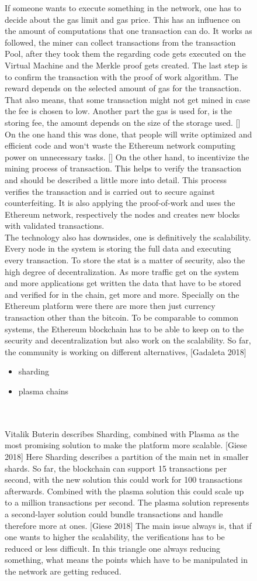 \begin{figure}[ht]
If someone wants to execute something in the network, one has to decide about the gas limit and gas price. This has an influence on the amount of computations that one transaction can do. It works as followed, the miner can collect transactions from the transaction Pool, after they took them the regarding code gets executed on the Virtual Machine and the Merkle proof gets created. The last step is to confirm the transaction with the proof of work algorithm. The reward depends on the selected amount of gas for the transaction. That also means, that some transaction might not get mined in case the fee is chosen to low. Another part the gas is used for, is the storing fee, the amount depends on the size of the storage used. []
On the one hand this was done, that people will write optimized and efficient code and won`t waste the Ethereum network computing power on unnecessary tasks. [] On the other hand, to incentivize the mining process of transaction. This helps to verify the transaction and should be described a little more into detail. This process verifies the transaction and is carried out to secure against counterfeiting. It is also applying the proof-of-work and uses the Ethereum network, respectively the nodes and creates new blocks with validated transactions. 
\\
The technology also has downsides, one is definitively the scalability. Every node in the system is storing the full data and executing every transaction. To store the stat is a matter of security, also the high degree of decentralization. As more traffic get on the system and more applications get written the data that have to be stored and verified for in the chain, get more and more. Specially on the Ethereum platform were there are more then just currency transaction other than the bitcoin. To be comparable to common systems, the Ethereum blockchain has to be able to keep on to the security and decentralization but also work on the scalability. 
So far, the community is working on different alternatives, [Gadaleta 2018]
\\
\begin{itemize}
\item sharding
\item plasma chains
\end{itemize}
\\
\\
Vitalik Buterin describes Sharding, combined with Plasma as the most promising solution to make the platform more scalable. [Giese 2018] Here Sharding describes a partition of the main net in smaller shards. So far, the blockchain can support 15 transactions per second, with the new solution this could work for 100 transactions afterwards. Combined with the plasma solution this could scale up to a million transactions per second. The plasma solution represents a second-layer solution could bundle transactions and handle therefore more at ones. [Giese 2018] The main issue always is, that if one wants to higher the scalability, the verifications has to be reduced or less difficult. In this triangle one always reducing something, what means the points which have to be manipulated in the network are getting reduced.

\end{figure}
